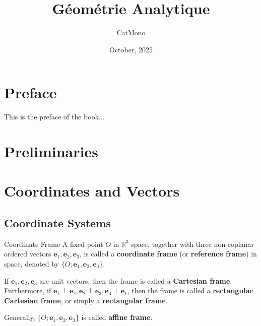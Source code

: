 \documentclass[11pt]{../../TexTemplate/elegantbook} %
\title{Géométrie Analytique} %
\author{CatMono} %
\date{October, 2025} %
\begin{document}
\maketitle %

\frontmatter        %
\tableofcontents    %

\chapter{Preface}   %
This is the preface of the book...

\mainmatter         %

\chapter{Preliminaries} %

\chapter{Coordinates and Vectors}
\section{Coordinate Systems}
\begin{definition}{Coordinate Frame}
    A fixed point \(O\) in \(\mathbb{R}^{3}\) space,
    together with three non-coplanar ordered vectors \(\mathbf{e}_{1}, \mathbf{e}_{2}, \mathbf{e}_{3}\),
    is called a \textbf{coordinate frame} (or \textbf{reference frame}) in space,
    denoted by \(\{O ; \mathbf{e}_{1}, \mathbf{e}_{2}, \mathbf{e}_{3}\}\).

    If \(\mathbf{e}_{1}, \mathbf{e}_{2}, \mathbf{e}_{3}\) are unit vectors,
    then the frame is called a \textbf{Cartesian frame}.
    Furthermore, if \(\mathbf{e}_{1} \perp \mathbf{e}_{2}, \mathbf{e}_{2} \perp \mathbf{e}_{3}, \mathbf{e}_{3} \perp \mathbf{e}_{1}\),
    then the frame is called a \textbf{rectangular Cartesian frame}, or simply a \textbf{rectangular frame}.

    Generally, \(\{O ; \mathbf{e}_{1}, \mathbf{e}_{2}, \mathbf{e}_{3}\}\) is called \textbf{affine frame}.
\end{definition}
\end{document}
